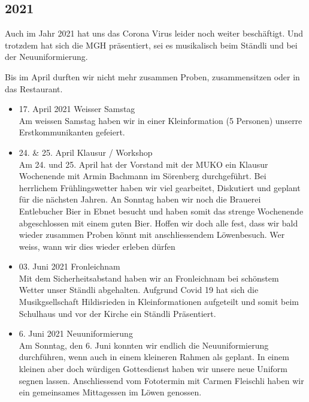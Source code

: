 
\subsection*{2021}
\begin{history}

    Auch im Jahr 2021 hat uns das Corona Virus leider noch weiter beschäftigt.
    Und trotzdem hat sich die MGH präsentiert, sei es musikalisch beim Ständli und bei der
    Neuuniformierung.

    Bis im April durften wir nicht mehr zusammen Proben, zusammensitzen oder in
    das Restaurant.

    \begin{itemize}

        \item 17. April 2021 Weisser Samstag\\
              Am weissen Samstag haben wir in einer Kleinformation (5 Personen)
              unserre Erstkommunikanten gefeiert.

        \item 24. & 25. April Klausur / Workshop\\
              Am 24. und 25. April hat der Vorstand mit der MUKO ein Klausur
              Wochenende mit Armin Bachmann im Sörenberg durchgeführt. Bei
              herrlichem Frühlingswetter haben wir viel gearbeitet, Diskutiert
              und geplant für die nächsten Jahren. An Sonntag haben wir noch die
              Brauerei Entlebucher Bier in Ebnet besucht und haben somit das
              strenge Wochenende abgeschlossen mit einem guten Bier. Hoffen wir
              doch alle fest, dass wir bald wieder zusammen Proben könnt mit
              anschliessendem Löwenbesuch. Wer weiss, wann wir dies wieder
              erleben dürfen

        \item 03. Juni 2021 Fronleichnam\\
              Mit dem Sicherheitsabstand haben wir an Fronleichnam bei schönstem Wetter unser Ständli
              abgehalten. Aufgrund Covid 19 hat sich die Musikgsellschaft Hildisrieden in Kleinformationen
              aufgeteilt und somit beim Schulhaus und vor der Kirche ein Ständli Präsentiert.

        \item 6. Juni 2021 Neuuniformierung\\
              Am Sonntag, den 6. Juni konnten wir endlich die Neuuniformierung durchführen, wenn auch
              in einem kleineren Rahmen als geplant. In einem kleinen aber doch würdigen Gottesdienst
              haben wir unsere neue Uniform segnen lassen. Anschliessend vom Fototermin mit Carmen
              Fleischli haben wir ein gemeinsames Mittagessen im Löwen genossen.


\end{itemize}
\end{history}
